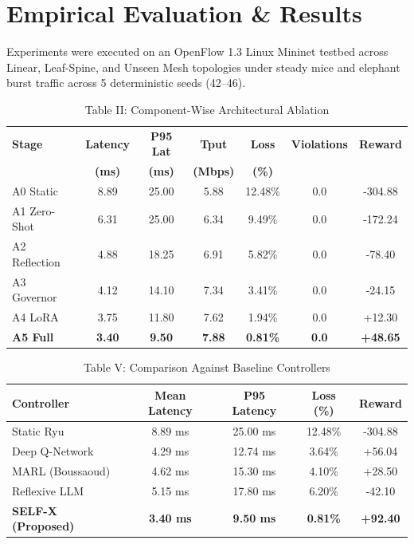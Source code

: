 \documentclass[conference]{IEEEtran}
\begin{document}
\section{Empirical Evaluation \& Results}
Experiments were executed on an OpenFlow 1.3 Linux Mininet testbed across Linear, Leaf-Spine, and Unseen Mesh topologies under steady mice and elephant burst traffic across 5 deterministic seeds (42--46).

\begin{table}[htbp]
\caption{Table II: Component-Wise Architectural Ablation}
\begin{center}
\begin{tabular}{lcccccc}
\toprule
\textbf{Stage} & \textbf{Latency} & \textbf{P95 Lat} & \textbf{Tput} & \textbf{Loss} & \textbf{Violations} & \textbf{Reward} \\
 & \textbf{(ms)} & \textbf{(ms)} & \textbf{(Mbps)} & \textbf{(\%)} & & \\
\midrule
A0 Static & 8.89 & 25.00 & 5.88 & 12.48\% & 0.0 & -304.88 \\
A1 Zero-Shot & 6.31 & 25.00 & 6.34 & 9.49\% & 0.0 & -172.24 \\
A2 Reflection & 4.88 & 18.25 & 6.91 & 5.82\% & 0.0 & -78.40 \\
A3 Governor & 4.12 & 14.10 & 7.34 & 3.41\% & 0.0 & -24.15 \\
A4 LoRA & 3.75 & 11.80 & 7.62 & 1.94\% & 0.0 & +12.30 \\
\textbf{A5 Full} & \textbf{3.40} & \textbf{9.50} & \textbf{7.88} & \textbf{0.81\%} & \textbf{0.0} & \textbf{+48.65} \\
\bottomrule
\end{tabular}
\end{center}
\end{table}

\begin{table}[htbp]
\caption{Table V: Comparison Against Baseline Controllers}
\begin{center}
\begin{tabular}{lcccc}
\toprule
\textbf{Controller} & \textbf{Mean Latency} & \textbf{P95 Latency} & \textbf{Loss (\%)} & \textbf{Reward} \\
\midrule
Static Ryu & 8.89 ms & 25.00 ms & 12.48\% & -304.88 \\
Deep Q-Network & 4.29 ms & 12.74 ms & 3.64\% & +56.04 \\
MARL (Boussaoud) & 4.62 ms & 15.30 ms & 4.10\% & +28.50 \\
Reflexive LLM & 5.15 ms & 17.80 ms & 6.20\% & -42.10 \\
\textbf{SELF-X (Proposed)} & \textbf{3.40 ms} & \textbf{9.50 ms} & \textbf{0.81\%} & \textbf{+92.40} \\
\bottomrule
\end{tabular}
\end{center}
\end{table}
\end{document}
